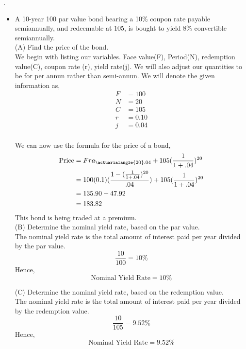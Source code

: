 \documentclass[12pt]{article}
\begin{document}
. 
\begin{itemize}
    \item A 10-year 100 par value bond bearing a 10\% coupon rate payable semiannually, and redeemable at 105, is bought to yield 8\% convertible semiannually.\\
    (A) Find the price of the bond.\\

    We begin with listing our variables. Face value(F), Period(N), redemption value(C), coupon rate (r), yield rate(j). We will
    also adjust our quantities to be for per annun rather than semi-annun. We will denote the given information as,
    \begin{align*}
	    F&=100\\
	    N&=20\\
	    C&=105\\
	    r&=0.10\\
	    j&=0.04\\
    \end{align*}

    We can now use the formula for the price of a bond,\\
    \begin{align*}
	    \text{Price} &= Fra_{\actuarialangle{20}.04}+105(\frac{1}{1+.04})^{20}\\
			 &= 100(0.1)(\frac{1-(\frac{1}{1+.04})^{20}}{.04})+105(\frac{1}{1+.04})^{20}\\
			 &= 135.90 + 47.92\\
			 &= 183.82\\
    \end{align*}
    This bond is being traded at a premium.\\
    (B) Determine the nominal yield rate, based on the par value.\\
    The nominal yield rate is the total amount of interest paid per year divided by the par value.\\
    $$\frac{10}{100} = 10\%$$
    Hence,
    $$\text{Nominal Yield Rate} = 10\%$$

    (C) Determine the nominal yield rate, based on the redemption value.\\
    The nominal yield rate is the total amount of interest paid per year divided by the redemption value.\\
    $$\frac{10}{105} = 9.52\%$$
    Hence,
    $$\text{Nominal Yield Rate} = 9.52\%$$
    


\end{itemize}
\end{document}
